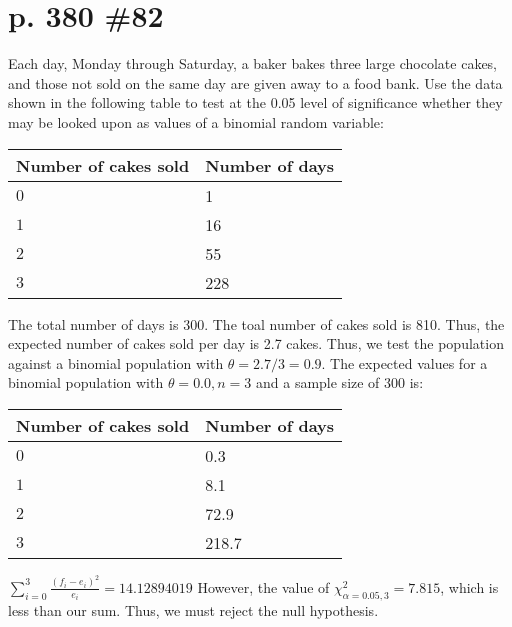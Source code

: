 \documentclass[12pt]{article}
\begin{document}
	\section[20pt]{p. 380 \#82}
Each day, Monday through Saturday, a baker bakes three large chocolate cakes, and those not sold on the same day are given away to a food bank. Use the data shown in the following table to test at the 0.05 level of significance whether they may be looked upon as values of a binomial random variable:
\newline
\begin{tabular}{|p{2.5cm}|p{2cm}|}
    \hline
    \textbf{Number of cakes sold} & \textbf{Number of days} \\
    \hline
    \(0\) & 1 \\
    \hline
    \(1\) & 16 \\
    \hline
    \(2\) & 55 \\
    \hline
    \(3\) & 228 \\
    \hline
\end{tabular}
\newline
The total number of days is 300. The toal number of cakes sold is 810.
\newline
Thus, the expected number of cakes sold per day is 2.7 cakes.
\newline
Thus, we test the population against a binomial population with \(\theta = 2.7/3 = 0.9\).
\newline
The expected values for a binomial population with \(\theta = 0.0, n = 3\) and a sample size of 300 is:
\newline
\begin{tabular}{|p{2.5cm}|p{2cm}|}
    \hline
    \textbf{Number of cakes sold} & \textbf{Number of days} \\
    \hline
    \(0\) & 0.3 \\
    \hline
    \(1\) & 8.1 \\
    \hline
    \(2\) & 72.9 \\
    \hline
    \(3\) & 218.7 \\
    \hline
\end{tabular}
\newline
\(\sum_{i=0}^3\frac{(f_i-e_i)^2}{e_i} = 14.12894019\)
\newline
However, the value of \(\chi^2_{\alpha = 0.05, 3} = 7.815\), which is less than our sum.
\newline
Thus, we must reject the null hypothesis.
\newline
\newline
{}
\newpage
\end{document}
